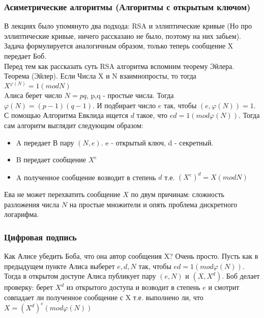 \subsubsection{Асиметрические алгоритмы (Алгоритмы с открытым ключом)}
В лекциях было упомянуто два подхода: RSA и эллиптические кривые (Но про эллиптические кривые, ничего рассказано не было, поэтому на них забьем). \\
Задача формулируется аналогичным образом, только теперь сообщение X передает Боб. \\
Перед тем как рассказать суть RSA алгоритма вспомним теорему Эйлера. \\
Теорема (Эйлер). Если Числа X и N взаимнопросты, то тогда $X^{\varphi (N)} = 1 (mod N)$ \\
Aлиса берет число $N = pq$, p,q - простые числа. Тогда $\varphi (N) = (p - 1)(q - 1)$. И подбирает число $e$ так, чтобы $(e, \varphi(N)) = 1$. С помощью Алгоритма Евклида ищется $d$ такое, что  $ed = 1 (mod \varphi (N))$. Тогда сам алгоритм выглядит следующим образом:
\begin {itemize}
\item A передает В пару $(N, e)$. e - открытый ключ, d - секретный.
\item B передает сообщение $X^e$
\item A полученное сообщение возводит в степень $d$ т.е. $(X^e)^d = X (mod N)$
\end {itemize}
Ева не может перехватить сообщение $X$ по двум причинам: сложность разложения числа $N$ на простые множители и опять проблема дискретного логарифма.

\subsubsection{Цифровая подпись}
Как Алисе убедить Боба, что она автор сообщения X? Очень просто. Пусть как в предыдущем пункте Алиса выберет $e, d, N$ так, чтобы $ed = 1 (mod \varphi (N))$. Тогда в открытом доступе Алиса публикует пару $(e, N)$ и  $(X, X^d)$. Боб делает проверку: берет $X^d$ из открытого доступа и возводит в степень $e$ и смотрит совпадает ли полученное сообщение с X  т.е. выполнено ли, что $X = (X^d)^e (mod \varphi (N))$





